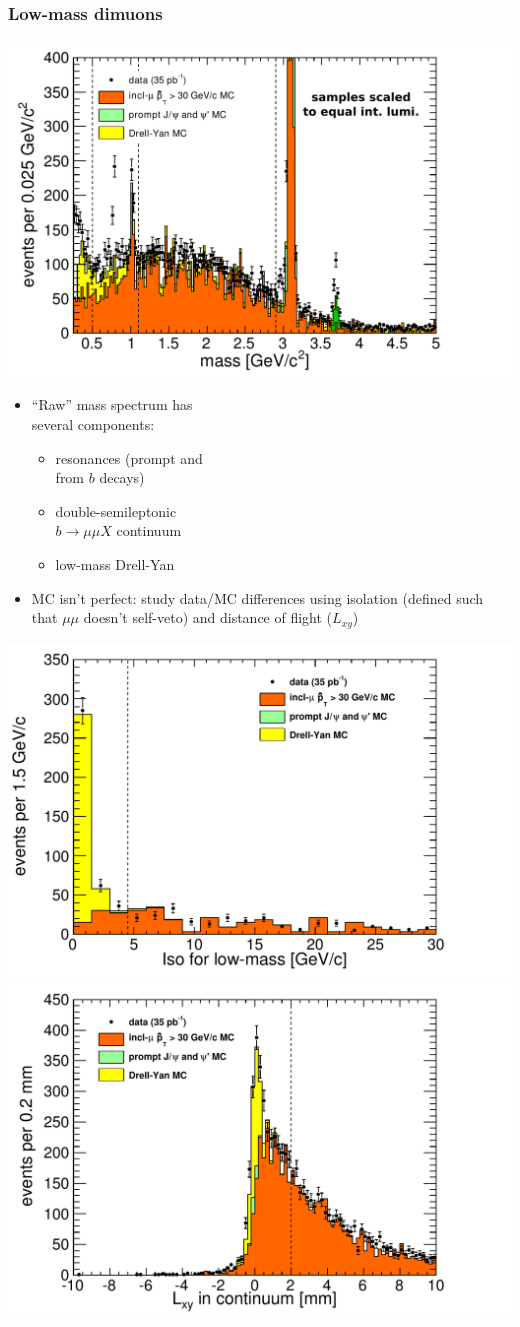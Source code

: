 \documentclass[compress]{beamer}
\begin{document}
\begin{frame}
\frametitle{Low-mass dimuons}

\vspace{0.25 cm}
\hfill \includegraphics[width=0.5\linewidth]{support_mass_all.pdf}

\vspace{-3.7 cm}
\begin{itemize}
\item ``Raw'' mass spectrum has \\ several components:
\begin{itemize}
\item resonances (prompt and \\ from $b$ decays)
\item double-semileptonic \\ $b \to \mu\mu X$ continuum
\item low-mass Drell-Yan
\end{itemize}

\item MC isn't perfect: study data/MC differences using isolation (defined
  such that $\mu\mu$ doesn't self-veto) and distance of flight ($L_{xy}$)
\end{itemize}

\includegraphics[width=0.5\linewidth]{support_iso_lowmass.pdf}
\includegraphics[width=0.5\linewidth]{support_lxy_continuum.pdf}
\end{frame}
\end{document}
